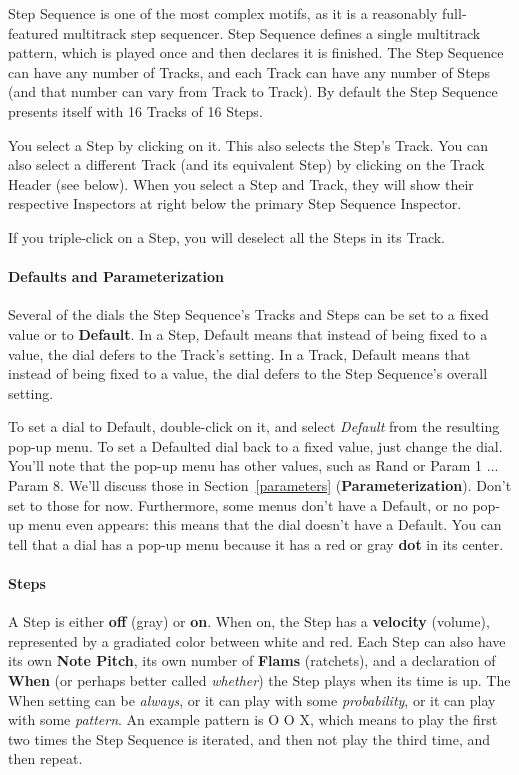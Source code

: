 \documentclass[twoside,10pt]{article}
\begin{document}
Step Sequence is one of the most complex motifs, as it is a reasonably full-featured multitrack step sequencer.  Step Sequence defines a single multitrack pattern, which is played once and then declares it is finished.  The Step Sequence can have any number of Tracks, and each Track can have any number of Steps (and that number can vary from Track to Track).  By default the Step Sequence presents itself with 16 Tracks of 16 Steps.  

You select a Step by clicking on it.  This also selects the Step's Track.  You can also select a different Track (and its equivalent Step) by clicking on the Track Header (see below).  When you select a Step and Track, they will show their respective Inspectors at right below the primary Step Sequence Inspector.

If you triple-click on a Step, you will deselect all the Steps in its Track.

\paragraph{Defaults and Parameterization}

Several of the dials the Step Sequence's Tracks and Steps can be set to a fixed value or to {\bf Default}.  In a Step, Default means that instead of being fixed to a value, the dial defers to the Track's setting.  In a Track, Default means that instead of being fixed to a value, the dial defers to the Step Sequence's overall setting.

To set a dial to Default, double-click on it, and select {\it Default} from the resulting pop-up menu.  To set a Defaulted dial back to a fixed value, just change the dial.  You'll note that the pop-up menu has other values, such as Rand or Param 1 ... Param 8.  We'll discuss those in Section~\ref{parameters} ({\bf Parameterization}).  Don't set to those for now.  Furthermore, some menus don't have a Default, or no pop-up menu even appears: this means that the dial doesn't have a Default.  You can tell that a dial has a pop-up menu because it has a red or gray {\bf dot} in its center. 

\paragraph{Steps}

A Step is either {\bf off} (gray) or {\bf on}.  When on, the Step has a {\bf velocity} (volume), represented by a gradiated color between white and red.  Each Step can also have its own {\bf Note Pitch}, its own number of {\bf Flams} (ratchets), and a declaration of {\bf When} (or perhaps better called {\it whether}) the Step plays when its time is up.  The When setting can be {\it always}, or it can play with some {\it probability}, or it can play with some {\it pattern}.  An example pattern is \textsf{O O X}, which means to play the first two times the Step Sequence is iterated, and then not play the third time, and then repeat. 
\end{document}
